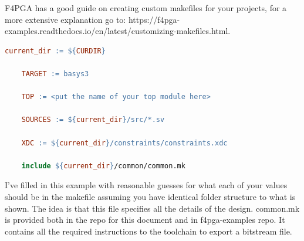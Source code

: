 F4PGA has a good guide on creating custom makefiles for your projects, for a more extensive explanation go to: 
https://f4pga-examples.readthedocs.io/en/latest/customizing-makefiles.html.

\begin{lstlisting}[language=make]
    current_dir := ${CURDIR}

    TARGET := basys3

    TOP := <put the name of your top module here>

    SOURCES := ${current_dir}/src/*.sv

    XDC := ${current_dir}/constraints/constraints.xdc

    include ${current_dir}/common/common.mk
\end{lstlisting}


I've filled in this example with reasonable guesses for what each of your values should be in the makefile assuming you have identical folder structure to what is shown.
The idea is that this file specifies all the details of the design. 
common.mk is provided both in the repo for this document and in f4pga-examples repo. 
It contains all the required instructions to the toolchain to export a bitstream file. 